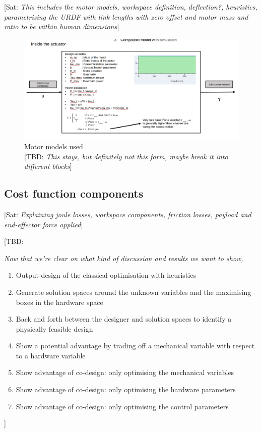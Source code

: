 \documentclass[letterpaper, 10 pt, conference]{ieeeconf}  %
\newcommand{\asc}[1]{{\color{blue!50!black} [Sat: {\em #1}]}\xspace}
\newcommand{\tbd}[1]{{\color{red!100!black} [TBD: {\em #1}]}\xspace}
\begin{document}
\asc{This includes the motor models, workspace definition, deflection?, heuristics, parametrising the URDF with link lengths with zero offset and motor mass and ratio to be within human dimensions}
\begin{figure}[h]
	\centering
	\includegraphics[scale=0.1]{motor-model-diva.png}
	\caption{Motor models used\\\tbd{This stays, but definitely not this form, maybe break it into different blocks}}
	\label{fig:motor_models}
\end{figure}

\subsection{Cost function components}
\asc{Explaining joule losses, workspace components, friction losses, payload and end-effector force applied}


\tbd{Now that we're clear on what kind of discussion and results we want to show, 
\begin{enumerate}
	\item Output design of the classical optimisation with heuristics
	\item Generate solution spaces around the unknown variables and the maximising boxes in the hardware space
	\item Back and forth between the designer and solution spaces to identify a physically feasible design
	\item Show a potential advantage by trading off a mechanical variable with respect to a hardware variable
	\item Show advantage of co-design: only optimising the mechanical variables
	\item Show advantage of co-design: only optimising the hardware parameters
	\item Show advantage of co-design: only optimising the control parameters
\end{enumerate}
}
\end{document}
